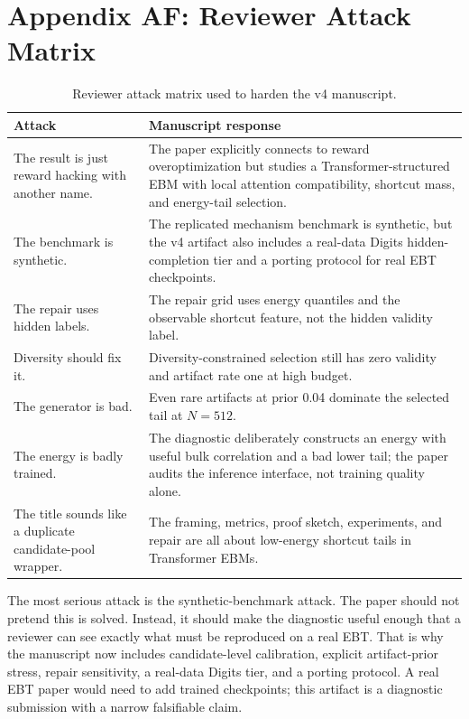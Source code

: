 \documentclass{article}
\begin{document}
\section*{Appendix AF: Reviewer Attack Matrix}

\begin{table}[t]
\centering
\small
\begin{tabular}{p{4.7cm}p{8.1cm}}
\toprule
Attack & Manuscript response \\
\midrule
The result is just reward hacking with another name. & The paper explicitly
connects to reward overoptimization but studies a Transformer-structured EBM
with local attention compatibility, shortcut mass, and energy-tail selection. \\
The benchmark is synthetic. & The replicated mechanism benchmark is synthetic,
but the v4 artifact also includes a real-data Digits hidden-completion tier and
a porting protocol for real EBT checkpoints. \\
The repair uses hidden labels. & The repair grid uses energy quantiles and the
observable shortcut feature, not the hidden validity label. \\
Diversity should fix it. & Diversity-constrained selection still has zero
validity and artifact rate one at high budget. \\
The generator is bad. & Even rare artifacts at prior 0.04 dominate the selected
tail at $N=512$. \\
The energy is badly trained. & The diagnostic deliberately constructs an
energy with useful bulk correlation and a bad lower tail; the paper audits the
inference interface, not training quality alone. \\
The title sounds like a duplicate candidate-pool wrapper. & The framing,
metrics, proof sketch, experiments, and repair are all about low-energy
shortcut tails in Transformer EBMs. \\
\bottomrule
\end{tabular}
\caption{Reviewer attack matrix used to harden the v4 manuscript.}
\label{tab:attack-matrix}
\end{table}

The most serious attack is the synthetic-benchmark attack. The paper should
not pretend this is solved. Instead, it should make the diagnostic useful
enough that a reviewer can see exactly what must be reproduced on a real EBT.
That is why the manuscript now includes candidate-level calibration, explicit
artifact-prior stress, repair sensitivity, a real-data Digits tier, and a
porting protocol. A real EBT paper would need to add trained checkpoints; this
artifact is a diagnostic submission with a narrow falsifiable claim.
\end{document}
